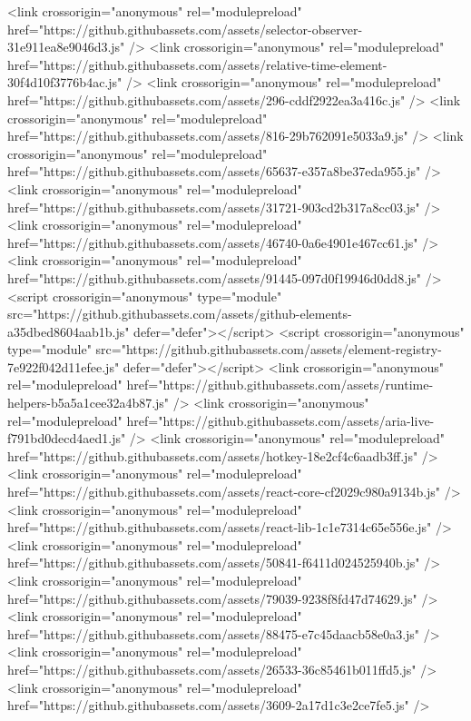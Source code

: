 <link crossorigin="anonymous" rel="modulepreload" href="https://github.githubassets.com/assets/selector-observer-31e911ea8e9046d3.js" />
<link crossorigin="anonymous" rel="modulepreload" href="https://github.githubassets.com/assets/relative-time-element-30f4d10f3776b4ac.js" />
<link crossorigin="anonymous" rel="modulepreload" href="https://github.githubassets.com/assets/296-cddf2922ea3a416c.js" />
<link crossorigin="anonymous" rel="modulepreload" href="https://github.githubassets.com/assets/816-29b762091e5033a9.js" />
<link crossorigin="anonymous" rel="modulepreload" href="https://github.githubassets.com/assets/65637-e357a8be37eda955.js" />
<link crossorigin="anonymous" rel="modulepreload" href="https://github.githubassets.com/assets/31721-903cd2b317a8cc03.js" />
<link crossorigin="anonymous" rel="modulepreload" href="https://github.githubassets.com/assets/46740-0a6e4901e467cc61.js" />
<link crossorigin="anonymous" rel="modulepreload" href="https://github.githubassets.com/assets/91445-097d0f19946d0dd8.js" />
<script crossorigin="anonymous" type="module" src="https://github.githubassets.com/assets/github-elements-a35dbed8604aab1b.js" defer="defer"></script>
<script crossorigin="anonymous" type="module" src="https://github.githubassets.com/assets/element-registry-7e922f042d11efee.js" defer="defer"></script>
<link crossorigin="anonymous" rel="modulepreload" href="https://github.githubassets.com/assets/runtime-helpers-b5a5a1cee32a4b87.js" />
<link crossorigin="anonymous" rel="modulepreload" href="https://github.githubassets.com/assets/aria-live-f791bd0decd4aed1.js" />
<link crossorigin="anonymous" rel="modulepreload" href="https://github.githubassets.com/assets/hotkey-18e2cf4c6aadb3ff.js" />
<link crossorigin="anonymous" rel="modulepreload" href="https://github.githubassets.com/assets/react-core-cf2029c980a9134b.js" />
<link crossorigin="anonymous" rel="modulepreload" href="https://github.githubassets.com/assets/react-lib-1c1e7314c65e556e.js" />
<link crossorigin="anonymous" rel="modulepreload" href="https://github.githubassets.com/assets/50841-f6411d024525940b.js" />
<link crossorigin="anonymous" rel="modulepreload" href="https://github.githubassets.com/assets/79039-9238f8fd47d74629.js" />
<link crossorigin="anonymous" rel="modulepreload" href="https://github.githubassets.com/assets/88475-e7c45daacb58e0a3.js" />
<link crossorigin="anonymous" rel="modulepreload" href="https://github.githubassets.com/assets/26533-36c85461b011ffd5.js" />
<link crossorigin="anonymous" rel="modulepreload" href="https://github.githubassets.com/assets/3609-2a17d1c3e2ce7fe5.js" />
